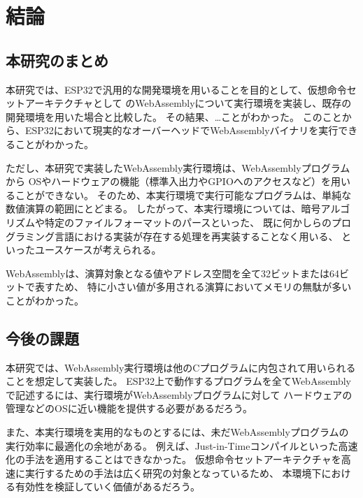 \chapter{結論}
\label{chap:conclusion}

\section{本研究のまとめ}
\label{section:matome}

本研究では、ESP32で汎用的な開発環境を用いることを目的として、仮想命令セットアーキテクチャとして
のWebAssemblyについて実行環境を実装し、既存の開発環境を用いた場合と比較した。
その結果、…ことがわかった。
このことから、ESP32において現実的なオーバーヘッドでWebAssemblyバイナリを実行できることがわかった。

ただし、本研究で実装したWebAssembly実行環境は、WebAssemblyプログラムから
OSやハードウェアの機能（標準入出力やGPIOへのアクセスなど）を用いることができない。
そのため、本実行環境で実行可能なプログラムは、単純な数値演算の範囲にとどまる。
したがって、本実行環境については、暗号アルゴリズムや特定のファイルフォーマットのパースといった、
既に何かしらのプログラミング言語における実装が存在する処理を再実装することなく用いる、
といったユースケースが考えられる。

WebAssemblyは、演算対象となる値やアドレス空間を全て32ビットまたは64ビットで表すため、
特に小さい値が多用される演算においてメモリの無駄が多いことがわかった。

\section{今後の課題}

本研究では、WebAssembly実行環境は他のCプログラムに内包されて用いられることを想定して実装した。
ESP32上で動作するプログラムを全てWebAssemblyで記述するには、実行環境がWebAssemblyプログラムに対して
ハードウェアの管理などのOSに近い機能を提供する必要があるだろう。

また、本実行環境を実用的なものとするには、未だWebAssemblyプログラムの実行効率に最適化の余地がある。
例えば、Just-in-Timeコンパイルといった高速化の手法を適用することはできなかった。
仮想命令セットアーキテクチャを高速に実行するための手法は広く研究の対象となっているため、
本環境下における有効性を検証していく価値があるだろう。

